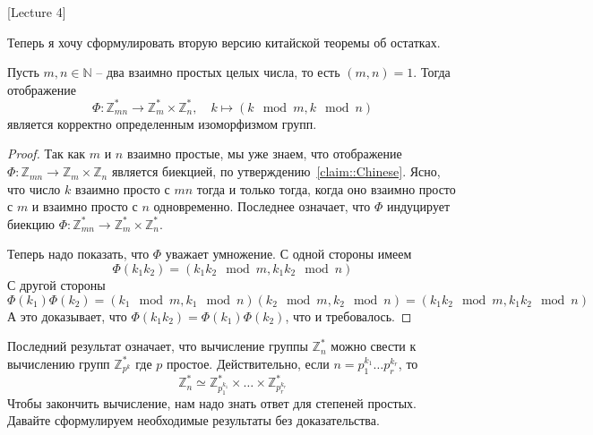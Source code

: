 [Lecture 4]


Теперь я хочу сформулировать вторую версию китайской теоремы об остатках.

\begin{claim}
\label{claim::ChineseMult}
Пусть $m, n\in \mathbb N$ -- два взаимно простых целых числа, то есть $(m,n) = 1$.
Тогда отображение
\[
\Phi \colon \mathbb Z_{mn}^* \to \mathbb Z_m^* \times \mathbb Z_n^*,\quad k\mapsto (k\!\!\mod m, k\!\!\mod n)
\]
является корректно определенным изоморфизмом групп.
\end{claim}
\begin{proof}
Так как $m$ и $n$ взаимно простые, мы уже знаем, что отображение $\Phi\colon\mathbb Z_{mn}\to \mathbb Z_m \times \mathbb Z_n$ является биекцией, по утверждению~\ref{claim::Chinese}.
Ясно, что число $k$ взаимно просто с $mn$ тогда и только тогда, когда оно взаимно просто с $m$ и взаимно просто с $n$ одновременно.
Последнее означает, что $\Phi$ индуцирует биекцию $\Phi\colon\mathbb Z_{mn}^*\to \mathbb Z_m^* \times \mathbb Z_n^*$.

Теперь надо показать, что $\Phi$ уважает умножение.
С одной стороны имеем
\[
\Phi(k_1k_2)  = (k_1k_2\!\!\mod m, k_1k_2\!\!\mod n)
\]
С другой стороны
\[
\Phi(k_1)\Phi(k_2) = (k_1\!\!\mod m, k_1\!\!\mod n)(k_2\!\!\mod m, k_2\!\!\mod n) = (k_1k_2\!\!\mod m, k_1k_2\!\!\mod n)
\]
А это доказывает, что $\Phi(k_1k_2) = \Phi(k_1)\Phi(k_2)$, что и требовалось.
\end{proof}

Последний результат означает, что вычисление группы $\mathbb Z_n^*$ можно свести к вычислению групп $\mathbb Z_{p^k}^*$ где $p$ простое.
Действительно, если $n = p_1^{k_1}\ldots p_r^{k_r}$, то
\[
\mathbb Z_n^* \simeq \mathbb Z_{p_1^{k_1}}^*\times\ldots \times \mathbb Z_{p_r^{k_r}}^*
\]
Чтобы закончить вычисление, нам надо знать ответ для степеней простых.
Давайте сформулируем необходимые результаты без доказательства.

